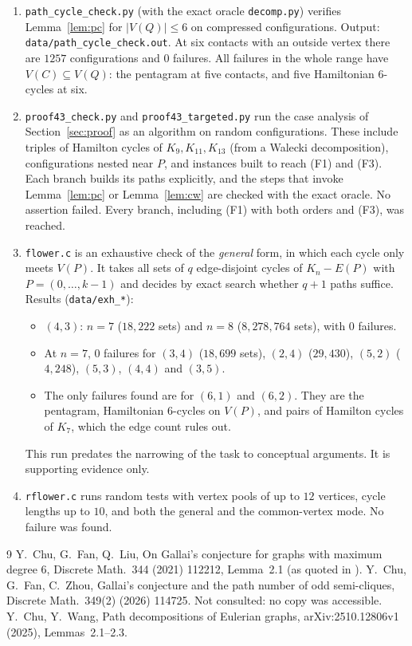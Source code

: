 \documentclass[11pt]{amsart}
\theoremstyle{definition}
\theoremstyle{remark}
\begin{document}
\begin{enumerate}[label=A.\arabic*, leftmargin=*]
\item \texttt{path\_cycle\_check.py} (with the exact oracle \texttt{decomp.py}) verifies
Lemma~\ref{lem:pc} for $|V(Q)|\le6$ on compressed configurations. Output:
\texttt{data/path\_cycle\_check.out}. At six contacts with an outside vertex there are $1257$
configurations and $0$ failures. All failures in the whole range have $V(C)\subseteq V(Q)$: the
pentagram at five contacts, and five Hamiltonian $6$-cycles at six.

\item \texttt{proof43\_check.py} and \texttt{proof43\_targeted.py} run the case analysis of
Section~\ref{sec:proof} as an algorithm on random configurations. These include triples of Hamilton
cycles of $K_9,K_{11},K_{13}$ (from a Walecki decomposition), configurations nested near $P$, and
instances built to reach (F1) and (F3). Each branch builds its paths explicitly, and the steps
that invoke Lemma~\ref{lem:pc} or Lemma~\ref{lem:cw} are checked with the exact oracle. No
assertion failed. Every branch, including (F1) with both orders and (F3), was reached.

\item \texttt{flower.c} is an exhaustive check of the \emph{general} form, in which each cycle only
meets $V(P)$. It takes all sets of $q$ edge-disjoint cycles of $K_n-E(P)$ with
$P=(0,\dots,k-1)$ and decides by exact search whether $q+1$ paths suffice. Results
(\texttt{data/exh\_*}):
\begin{itemize}
\item $(4,3)$: $n=7$ ($18{,}222$ sets) and $n=8$ ($8{,}278{,}764$ sets), with $0$ failures.
\item At $n=7$, $0$ failures for $(3,4)$ ($18{,}699$ sets), $(2,4)$ ($29{,}430$), $(5,2)$
($4{,}248$), $(5,3)$, $(4,4)$ and $(3,5)$.
\item The only failures found are for $(6,1)$ and $(6,2)$. They are the pentagram, Hamiltonian
$6$-cycles on $V(P)$, and pairs of Hamilton cycles of $K_7$, which the edge count rules out.
\end{itemize}
This run predates the narrowing of the task to conceptual arguments. It is supporting evidence
only.

\item \texttt{rflower.c} runs random tests with vertex pools of up to $12$ vertices, cycle lengths
up to $10$, and both the general and the common-vertex mode. No failure was found.
\end{enumerate}

\begin{thebibliography}{9}
 Y.~Chu, G.~Fan, Q.~Liu, On Gallai's conjecture for graphs with maximum degree 6,
Discrete Math.\ 344 (2021) 112212, Lemma~2.1 (as quoted in \cite{CW}).
 Y.~Chu, G.~Fan, C.~Zhou, Gallai's conjecture and the path number of odd
semi-cliques, Discrete Math.\ 349(2) (2026) 114725. Not consulted: no copy was accessible.
 Y.~Chu, Y.~Wang, Path decompositions of Eulerian graphs, arXiv:2510.12806v1 (2025),
Lemmas~2.1--2.3.
\end{thebibliography}
\end{document}

